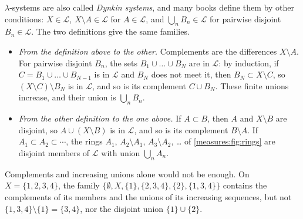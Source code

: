 \begin{notechapter}
\begin{remark}
\label{measures:rem:dynkin}
$\lambda$-systems are also called \emph{Dynkin systems}, and many books
define them by other conditions: $X\in\mathcal L$, $X\setminus A\in\mathcal L$
for $A\in\mathcal L$, and $\bigcup_nB_n\in\mathcal L$ for pairwise disjoint
$B_n\in\mathcal L$. The two definitions give the same families.
\begin{itemize}[nosep]
  \item \emph{From the definition above to the other.} Complements are
        the differences $X\setminus A$. For pairwise disjoint $B_n$, the
        sets $B_1\cup\dots\cup B_N$ are in $\mathcal L$: by induction,
        if $C = B_1\cup\dots\cup B_{N-1}$ is in $\mathcal L$ and $B_N$
        does not meet it, then $B_N\subset X\setminus C$, so
        $(X\setminus C)\setminus B_N$ is in $\mathcal L$, and so is its
        complement $C\cup B_N$. These finite unions increase, and their
        union is $\bigcup_nB_n$.
  \item \emph{From the other definition to the one above.} If
        $A\subset B$, then $A$ and $X\setminus B$ are disjoint, so
        $A\cup(X\setminus B)$ is in $\mathcal L$, and so is its
        complement $B\setminus A$. If $A_1\subset A_2\subset\cdots$, the
        rings $A_1$, $A_2\setminus A_1$, $A_3\setminus A_2$, \dots{} of
        \cref{measures:fig:rings} are disjoint members of $\mathcal L$
        with union $\bigcup_nA_n$.
\end{itemize}
Complements and increasing unions alone would not be enough. On
$X = \{1, 2, 3, 4\}$, the family
$\{\emptyset, X, \{1\}, \{2, 3, 4\}, \{2\}, \{1, 3, 4\}\}$ contains the
complements of its members and the unions of its increasing sequences,
but not $\{1, 3, 4\}\setminus\{1\} = \{3, 4\}$, nor the disjoint union
$\{1\}\cup\{2\}$.
\end{remark}


\end{notechapter}
